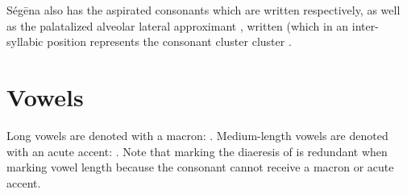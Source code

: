 
Ségēna also has the aspirated consonants  which are written  respectively, as well as the
palatalized alveolar lateral approximant , written
 (which in an inter-syllabic position represents the consonant
cluster cluster .

\section{Vowels}


Long vowels are denoted with a macron: . Medium-length
vowels are denoted with an acute accent: . Note that
marking the diaeresis of  is redundant when marking vowel length
because the consonant  cannot receive a macron or acute accent.

